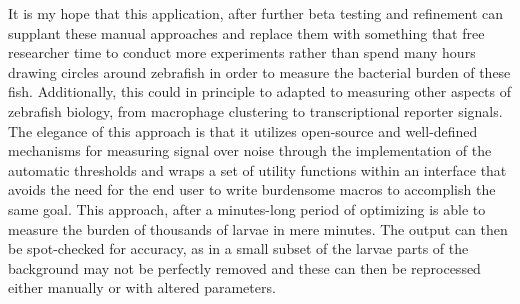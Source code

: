 It is my hope that this application, after further beta testing and refinement can supplant these manual approaches and replace them with something that free researcher time to conduct more experiments rather than spend many hours drawing circles around zebrafish in order to measure the bacterial burden of these fish. Additionally, this could in principle to adapted to measuring other aspects of zebrafish biology, from macrophage clustering to transcriptional reporter signals. The elegance of this approach is that it utilizes open-source and well-defined mechanisms for measuring signal over noise through the implementation of the automatic thresholds and wraps a set of utility functions within an interface that avoids the need for the end user to write burdensome macros to accomplish the same goal. This approach, after a minutes-long period of optimizing is able to measure the burden of thousands of larvae in mere minutes. The output can then be spot-checked for accuracy, as in a small subset of the larvae parts of the background may not be perfectly removed and these can then be reprocessed either manually or with altered parameters. 


